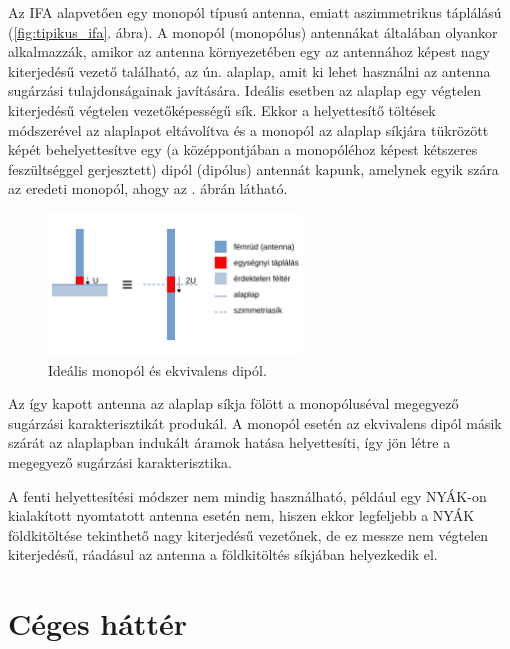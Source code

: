 \par Az IFA alapvetően egy monopól típusú antenna, emiatt aszimmetrikus táplálású (\ref{fig:tipikus_ifa}. ábra). A monopól (monopólus) antennákat általában olyankor alkalmazzák, amikor az antenna környezetében egy az antennához képest nagy kiterjedésű vezető található, az ún. alaplap, amit ki lehet használni az antenna sugárzási tulajdonságainak javítására. Ideális esetben az alaplap egy végtelen kiterjedésű végtelen vezetőképességű sík. Ekkor a helyettesítő töltések módszerével \cite{fodor} az alaplapot eltávolítva és a monopól az alaplap síkjára tükrözött képét behelyettesítve egy (a középpontjában a monopóléhoz képest kétszeres feszültséggel gerjesztett) dipól (dipólus) antennát kapunk, amelynek egyik szára az eredeti monopól, ahogy az . ábrán látható.
\begin{figure}[h]
	\centering
	\includegraphics[width=0.6\textwidth]{kep/monopol.pdf}
	\caption{Ideális monopól és ekvivalens dipól.}
	\label{fig:monopol}
\end{figure}
\par Az így kapott antenna az alaplap síkja fölött a monopóluséval megegyező sugárzási karakterisztikát produkál. A monopól esetén az ekvivalens dipól másik szárát az alaplapban indukált áramok hatása helyettesíti, így jön létre a megegyező sugárzási karakterisztika.
\par A fenti helyettesítési módszer nem mindig használható, például egy NYÁK-on kialakított nyomtatott antenna esetén nem, hiszen ekkor legfeljebb a NYÁK földkitöltése tekinthető nagy kiterjedésű vezetőnek, de ez messze nem végtelen kiterjedésű, ráadásul az antenna a földkitöltés síkjában helyezkedik el.
\section{Céges háttér}

